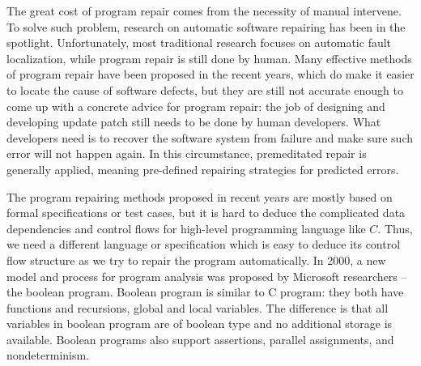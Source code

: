 \documentclass[10pt,journal,final,]{article}
\theoremstyle{definition}
\begin{document}
The great cost of program repair comes from the necessity of manual intervene\cite{SFTiaCA:TaRM}.
To solve such problem, research on automatic software repairing has been in the spotlight.
Unfortunately, most traditional research focuses on automatic fault localization, while program repair is still done by human.
Many effective methods of program repair have been proposed in the recent years, which do make it easier to locate the cause of software defects, but they are still not accurate enough to come up with a concrete advice for program repair: the job of designing and developing update patch still needs to be done by human developers.
What developers need is to recover the software system from failure and make sure such error will not happen again\cite{MBAfSHS}. In this circumstance, premeditated repair is generally applied, meaning pre-defined repairing strategies for predicted errors.

The program repairing methods proposed in recent years are mostly based on formal specifications or test cases, but it is hard to deduce the complicated data dependencies and control flows for high-level programming language like $C$.
Thus, we need a different language or specification which is easy to deduce its control flow structure as we try to repair the program automatically.
In 2000, a new model and process for program analysis was proposed by Microsoft researchers -- the boolean program\cite{BP:aMaPfSA}.
Boolean program is similar to C program: they both have functions and recursions, global and local variables\cite{Bb:aSMCfBP}.
The difference is that all variables in boolean program are of boolean type and no additional storage is available.
Boolean programs also support assertions, parallel assignments, and nondeterminism.
\end{document}
